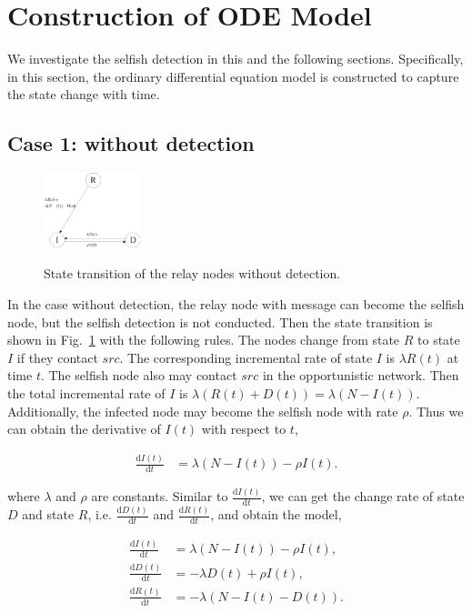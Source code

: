 \section{Construction of ODE Model}
\label{sec:wo_detect}
We investigate the selfish detection in this and the following sections.
Specifically, in this section, the ordinary differential equation model
is constructed to capture the state change with time.
\subsection{Case 1: without detection}
\label{subsec:wo_detc}
\begin{figure}
  \centering
  {\includegraphics[width=0.25\textwidth]
  {fig/state_transition_no_detect.eps}}
     \caption{State transition of the relay nodes without detection.}
     \label{fig:ss_wo_dt}
\end{figure}
In the case without detection,
the relay node with message can become the selfish node,
but the selfish detection is not conducted.
Then the state transition is shown
in Fig.~\ref{fig:ss_wo_dt} with the following rules.
The nodes change from state $R$ to state $I$ if they contact $src$.
The corresponding incremental rate of state $I$ is $\lambda R(t)$ at time $t$.
The selfish node also may contact $src$ in the opportunistic network.
Then the total incremental rate of $I$ is
$\lambda (R(t)+D(t))=\lambda (N-I(t))$.
Additionally, the infected node may become the selfish node with rate $\rho$.
Thus we can obtain the derivative of $I(t)$ with respect to $t$,
\begin{small}
\begin{equation}
\nonumber
\begin{aligned}
\frac{\mathrm{d} I(t)}{\mathrm{d} t} &= \lambda (N-I(t)) - \rho I(t).
\end{aligned}
\end{equation}
\end{small}
where $\lambda$ and $\rho$ are constants.
Similar to $\frac{\mathrm{d} I(t)}{\mathrm{d} t}$,
we can get the change rate of state $D$ and state $R$,
i.e. $\frac{\mathrm{d} D(t)}{\mathrm{d} t}$ and
$\frac{\mathrm{d} R(t)}{\mathrm{d} t}$,
and obtain the model,
\begin{small}
\begin{equation}
\label{eq:IDR_wo}
\begin{aligned}
\frac{\mathrm{d} I(t)}{\mathrm{d} t} &=  \lambda (N-I(t)) - \rho I(t),\\
\frac{\mathrm{d} D(t)}{\mathrm{d} t} &= - \lambda D(t) + \rho I(t),\\
\frac{\mathrm{d} R(t)}{\mathrm{d} t} &= - \lambda (N-I(t)-D(t)).
\end{aligned}
\end{equation}
\end{small}
